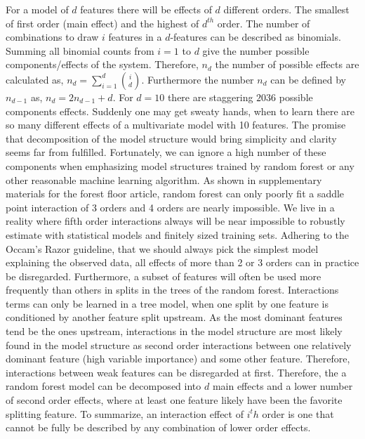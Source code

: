 For a model of $d$ features there will be effects of $d$ different orders. The smallest of first order (main effect) and the highest of $d^{th}$ order. The number of combinations to draw $i$ features in a $d$-features can be described as binomials. Summing all binomial counts from $i=1$ to $d$ give the number possible components/effects of the system. Therefore, $n_d$ the number of possible effects are calculated as, 
$n_d = \sum_{i=1}^{d} \binom{i}{d}$. Furthermore the number $n_d$ can be defined by $n_{d-1}$ as,
$n_d = 2n_{d-1} + d$. For $d=10$ there are staggering $2036$ possible components effects. Suddenly one may get sweaty hands, when to learn there are so many different effects of a multivariate model with 10 features. The promise that decomposition of the model structure would bring simplicity and clarity seems far from fulfilled. Fortunately, we can ignore a high number of these components when emphasizing model structures trained by random forest or any other reasonable machine learning algorithm. As shown in supplementary materials for the forest floor article, random forest can only poorly fit a saddle point interaction of 3 orders and 4 orders are nearly impossible. We live in a reality where fifth order interactions always will be near impossible to robustly estimate with statistical models and finitely sized training sets. Adhering to the Occam's Razor guideline, that we should always pick the simplest model explaining the observed data, all effects of more than 2 or 3 orders can in practice be disregarded. Furthermore, a subset of features will often be used more frequently than others in splits in the trees of the random forest. Interactions terms can only be learned in a tree model, when one split by one feature is conditioned by another feature split upstream. As the most dominant features tend be the ones upstream, interactions in the model structure are most likely found in the model structure as second order interactions between one relatively dominant feature (high variable importance) and some other feature. Therefore, interactions between weak features can be disregarded at first. Therefore, the a random forest model can be decomposed into $d$ main effects and a lower number of second order effects, where at least one feature likely have been the favorite splitting feature. To summarize, an interaction effect of $i^th$ order is one that cannot be fully be described by any combination of lower order effects.

